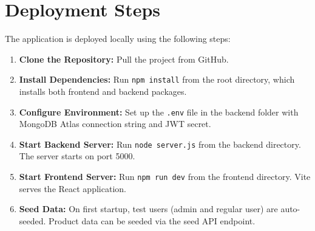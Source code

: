 \section{Deployment Steps}

The application is deployed locally using the following steps:

\begin{enumerate}
    \item \textbf{Clone the Repository:} Pull the project from GitHub.
    \item \textbf{Install Dependencies:} Run \texttt{npm install} from the root directory, which installs both frontend and backend packages.
    \item \textbf{Configure Environment:} Set up the \texttt{.env} file in the backend folder with MongoDB Atlas connection string and JWT secret.
    \item \textbf{Start Backend Server:} Run \texttt{node server.js} from the backend directory. The server starts on port 5000.
    \item \textbf{Start Frontend Server:} Run \texttt{npm run dev} from the frontend directory. Vite serves the React application.
    \item \textbf{Seed Data:} On first startup, test users (admin and regular user) are auto-seeded. Product data can be seeded via the seed API endpoint.
\end{enumerate}